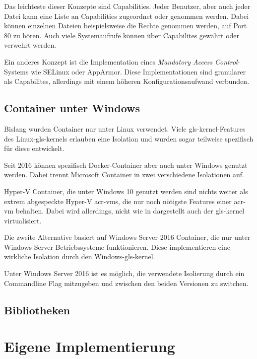 Das leichteste dieser Konzepte sind Capabilities. Jeder Benutzer, aber auch jeder Datei kann eine Liste an Capabilities zugeordnet oder genommen werden. Dabei können einzelnen Dateien beispielsweise die Rechte genommen werden, auf Port 80 zu hören. Auch viele Systemaufrufe können über Capabilites gewährt oder verwehrt werden. 

Ein anderes Konzept ist die Implementation eines \textit{Mandatory Access Control}-Systems wie SELinux oder AppArmor. Diese Implementationen sind granularer als Capabilites, allerdings mit einem höheren Konfigurationsaufwand verbunden.

\subsection{Container unter Windows}
\label{sec:windows}
Bislang wurden Container nur unter Linux verwendet. Viele \gls{gls-kernel}-Features des Linux-\glspl{gls-kernel} erlauben eine Isolation und wurden sogar teilweise spezifisch für diese entwickelt.

Seit 2016 können spezifisch Docker-Container aber auch unter Windows genutzt werden. Dabei trennt Microsoft Container in zwei verschiedene Isolationen auf.

Hyper-V Container, die unter Windows 10 genutzt werden sind nichts weiter als extrem abgespeckte Hyper-V \glspl{acr-vm}, die nur noch nötigste Features einer \gls{acr-vm} behalten. Dabei wird allerdings, nicht wie in  dargestellt auch der \gls{gls-kernel} virtualisiert.

Die zweite Alternative basiert auf Windows Server 2016 Container, die nur unter Windows Server Betriebssysteme funktionieren. Diese implementieren eine wirkliche Isolation durch den Windows-\gls{gls-kernel}.

Unter Windows Server 2016 ist es möglich, die verwendete Isolierung durch ein Commandline Flag mitzugeben und zwischen den beiden Versionen zu switchen. 

\subsection{Bibliotheken}
\label{sec:libs}

\section{Eigene Implementierung}
\label{sec:eigeneImpl}


